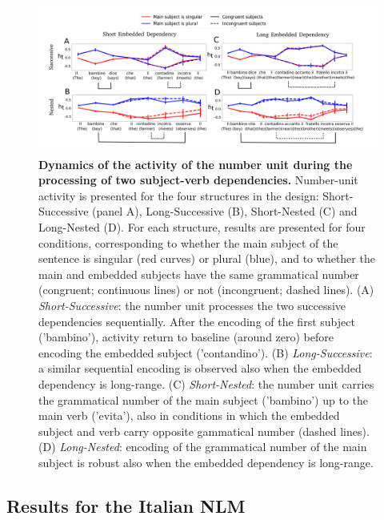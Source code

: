 \begin{figure}[ht]
    \centering
    \includegraphics[width=\textwidth, clip, trim={0mm 0mm 0mm 0mm}]{figures/model_activations_2by2.png}
    \caption{\textbf{Dynamics of the activity of the number unit during the processing of two subject-verb dependencies.} Number-unit activity is presented for the four structures in the design: Short-Successive (panel A), Long-Successive (B), Short-Nested (C) and Long-Nested (D). For each structure, results are presented for four conditions, corresponding to whether the main subject of the sentence is singular (red curves) or plural (blue), and to whether the main and embedded subjects have the same grammatical number (congruent; continuous lines) or not (incongruent; dashed lines). (A) \textit{Short-Successive}: the number unit processes the two successive dependencies sequentially. After the encoding of the first subject ('bambino'), activity return to baseline (around zero) before encoding the embedded subject ('contandino'). (B) \textit{Long-Successive}: a similar sequential encoding is observed also when the embedded dependency is long-range. (C) \textit{Short-Nested}: the number unit carries the grammatical number of the main subject ('bambino') up to the main verb ('evita'), also in conditions in which the embedded subject and verb carry opposite gammatical number (dashed lines). (D) \textit{Long-Nested}: encoding of the grammatical number of the main subject is robust also when the embedded dependency is long-range.}
    \label{fig:2by2_dynamics}
\end{figure}




\subsection{Results for the Italian NLM}
